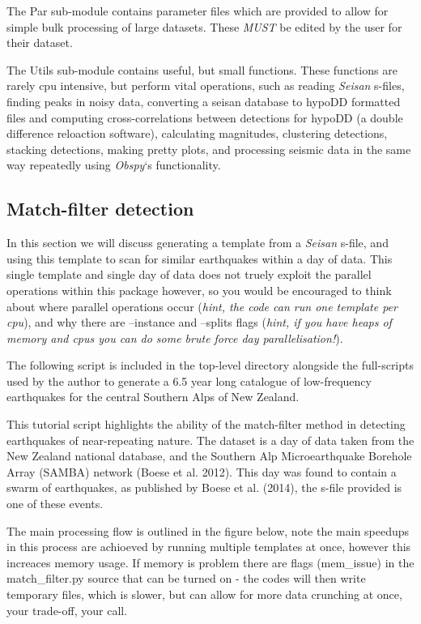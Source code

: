 \documentclass[a4paper,10pt,english]{sphinxmanual}
\begin{document}
The Par sub-module contains parameter files which are provided to allow for simple
bulk processing of large datasets.  These \emph{MUST} be edited by the user for their
dataset.

The Utils sub-module contains useful, but small functions.  These functions are
rarely cpu intensive, but perform vital operations, such as reading \emph{Seisan} s-files,
finding peaks in noisy data, converting a seisan database to hypoDD formatted
files and computing cross-correlations between detections for hypoDD (a double
difference reloaction software), calculating magnitudes, clustering detections,
stacking detections, making pretty plots, and processing seismic data in the
same way repeatedly using \emph{Obspy}`s functionality.


\subsection{Match-filter detection}
\label{tutorial:match-filter-detection}
In this section we will discuss generating a template from a \emph{Seisan} s-file, and
using this template to scan for similar earthquakes within a day of data.  This single
template and single day of data does not truely exploit the parallel operations within
this package however, so you would be encouraged to think about where parallel operations
occur (\emph{hint, the code can run one template per cpu}), and why there are --instance and
--splits flags (\emph{hint, if you have heaps of memory and cpus you can do some brute
force day parallelisation!}).

The following script is included in the top-level directory alongside the full-scripts
used by the author to generate a 6.5 year long catalogue of low-frequency earthquakes
for the central Southern Alps of New Zealand.

This tutorial script highlights the ability of the match-filter method in detecting
earthquakes of near-repeating nature.  The dataset is a day of data taken from the
New Zealand national database, and the Southern Alp Microearthquake Borehole Array
(SAMBA) network (Boese et al. 2012).  This day was found to contain a swarm of
earthquakes, as published by Boese et al. (2014), the s-file provided is one of
these events.

The main processing flow is outlined in the figure below, note the main speedups
in this process are achioeved by running multiple templates at once, however this
increaces memory usage.  If memory is problem there are flags (mem\_issue) in the
match\_filter.py source that can be turned on - the codes will then write temporary
files, which is slower, but can allow for more data crunching at once, your trade-off,
your call.
\end{document}

